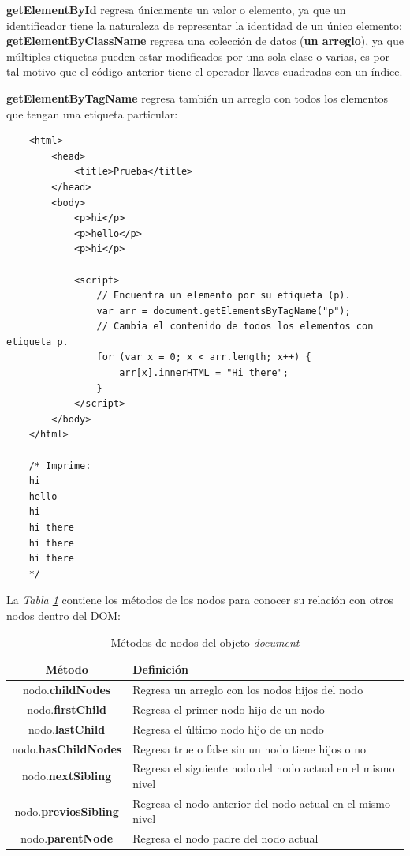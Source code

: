 \textbf{getElementById} regresa únicamente un valor o elemento, ya que un identificador tiene la naturaleza de representar la identidad de un único elemento; \textbf{getElementByClassName} regresa una colección de datos (\textbf{un arreglo}), ya que múltiples etiquetas pueden estar modificados por una sola clase o varias, es por tal motivo que el código anterior tiene el operador llaves cuadradas con un índice.

\textbf{getElementByTagName} regresa también un arreglo con todos los elementos que tengan una etiqueta particular:
\begin{lstlisting}
    <html>
        <head>
            <title>Prueba</title>
        </head>
        <body>
            <p>hi</p>
            <p>hello</p>
            <p>hi</p>
            
            <script>
                // Encuentra un elemento por su etiqueta (p).
                var arr = document.getElementsByTagName("p");
                // Cambia el contenido de todos los elementos con etiqueta p.
                for (var x = 0; x < arr.length; x++) {
                    arr[x].innerHTML = "Hi there";
                }
            </script>
        </body>
    </html>

    /* Imprime:
    hi
    hello
    hi
    hi there
    hi there
    hi there
    */
\end{lstlisting}

La \textit{Tabla \ref{tab: 9}} contiene los métodos de los nodos para conocer su relación con otros nodos dentro del DOM:
\begin{table}[H]
    \begin{center}
        \caption{Métodos de nodos del objeto \textit{document}}
        \label{tab: 9}
        \begin{tabular}{c l}
            \hline
            \textbf{Método}&\textbf{Definición} \\
            \hline
            nodo.\textbf{childNodes}        & Regresa un arreglo con los nodos hijos del nodo \\
            nodo.\textbf{firstChild}        & Regresa el primer nodo hijo de un nodo \\
            nodo.\textbf{lastChild}         & Regresa el último nodo hijo de un nodo \\
            nodo.\textbf{hasChildNodes}     & Regresa true o false sin un nodo tiene hijos o no \\
            nodo.\textbf{nextSibling}       & Regresa el siguiente nodo del nodo actual en el mismo nivel \\
            nodo.\textbf{previosSibling}    & Regresa el nodo anterior del nodo actual en el mismo nivel \\
            nodo.\textbf{parentNode}        & Regresa el nodo padre del nodo actual \\
            \hline
        \end{tabular}
    \end{center}
\end{table}


